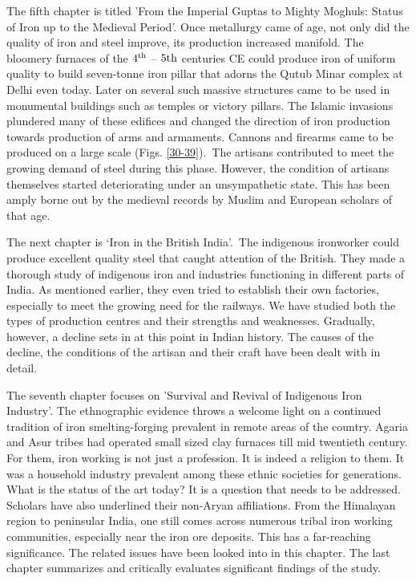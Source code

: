 The fifth chapter is titled 'From the Imperial Guptas to Mighty Moghuls: Status of Iron up to the Medieval Period'. Once metallurgy came of age, not only did the quality of iron and steel improve, its production increased manifold. The bloomery furnaces of the $4^{\rm th}$ – $5{\rm th}$ centuries CE could produce iron of uniform quality to build seven-tonne iron pillar that adorns the Qutub Minar complex at Delhi even today. Later on several such massive structures came to be used in monumental buildings such as temples or victory pillars. The Islamic invasions plundered many of these edifices and changed the direction of iron production towards production of arms and armaments. Cannons and firearms came to be produced on a large scale (Figs. \ref{30-39}).~The artisans contributed to meet the growing demand of steel during this phase. However, the condition of artisans themselves started deteriorating under an unsympathetic state. This has been amply borne out by the medieval records by Muslim and European scholars of that age.

The next chapter is `Iron in the British India'.~The indigenous ironworker could produce excellent quality steel that caught attention of the British. They made a thorough study of indigenous iron and industries functioning in different parts of India. As mentioned earlier, they even tried to establish their own factories, especially to meet the growing need for the railways. We have studied both the types of production centres and their strengths and weaknesses. Gradually, however, a decline sets in at this point in Indian history. The causes of the decline, the conditions of the artisan and their craft have been dealt with in detail.

The seventh chapter focuses on 'Survival and Revival of Indigenous Iron Industry'. The ethnographic evidence throws a welcome light on a continued tradition of iron smelting-forging prevalent in remote areas of the country. Agaria and Asur tribes had operated small sized clay furnaces till mid twentieth century. For them, iron working is not just a profession. It is indeed a religion to them. It was a household industry prevalent among these ethnic societies for generations. What is the status of the art today? It is a question that needs to be addressed. Scholars have also underlined their non-Aryan affiliations. From the Himalayan region to peninsular India, one still comes across numerous tribal iron working communities, especially near the iron ore deposits. This has a far-reaching significance. The related issues have been looked into in this chapter. The last chapter summarizes and critically evaluates significant findings of the study.










